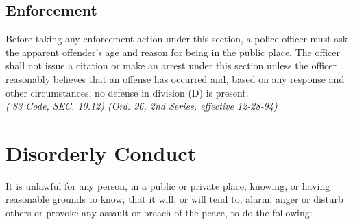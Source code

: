 \subsection{Enforcement}  Before taking any enforcement action under this section, a police officer must ask the apparent offender’s age and reason for being in the public place.  The officer shall not issue a citation or make an arrest under this section unless the officer reasonably believes that an offense has occurred and, based on any response and other circumstances, no defense in division (D) is present.\\
\emph{(‘83 Code, SEC. 10.12)  (Ord. 96, 2nd Series, effective 12-28-94)}
\section{Disorderly Conduct}
It is unlawful for any person, in a public or private place, knowing, or having reasonable grounds to know, that it will, or will tend to, alarm, anger or disturb others or provoke any assault or breach of the peace, to do the following:
